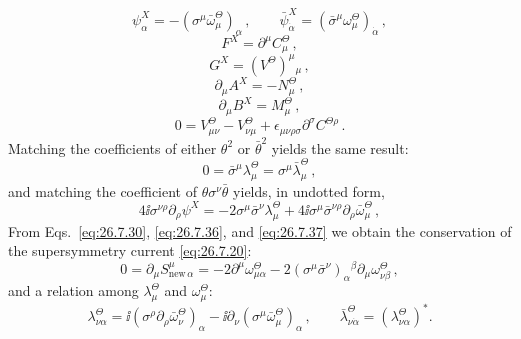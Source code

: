 \begin{equation}
  \psi_\alpha^X
  =-(\sigma^\mu\bar\omega_\mu^\Theta)_\alpha\,,
  \qquad
  \bar\psi_{\dot\alpha}^X
  =(\bar\sigma^\mu\omega_\mu^\Theta)_{\dot\alpha}\,,
  \tag{26.7.30}\label{eq:26.7.30}
\end{equation}
\begin{equation}
  F^X=\partial^\mu C_\mu^\Theta\,,
  \tag{26.7.31}\label{eq:26.7.31}
\end{equation}
\begin{equation}
  G^X=(V^\Theta)^\mu{}_\mu\,,
  \tag{26.7.32}\label{eq:26.7.32}
\end{equation}
\begin{equation}
  \partial_\mu A^X=-N_\mu^\Theta\,,
  \tag{26.7.33}\label{eq:26.7.33}
\end{equation}
\begin{equation}
  \partial_\mu B^X=M_\mu^\Theta\,,
  \tag{26.7.34}\label{eq:26.7.34}
\end{equation}
\begin{equation}
  0=V_{\mu\nu}^\Theta-V_{\nu\mu}^\Theta
    +\epsilon_{\mu\nu\rho\sigma}\partial^\sigma C^{\Theta\rho}\,.
  \tag{26.7.35}\label{eq:26.7.35}
\end{equation}
Matching the coefficients of either \(\theta^2\) or \(\bar\theta^2\)
yields the same result:
\begin{equation}
  0=\bar\sigma^\mu\lambda_\mu^\Theta
  =\sigma^\mu\bar\lambda_\mu^\Theta\,,
  \tag{26.7.36}\label{eq:26.7.36}
\end{equation}
and matching the coefficient of \(\theta\sigma^\nu\bar\theta\) yields,
in undotted form,
\begin{equation}
  4\ii\sigma^{\nu\rho}\partial_\rho\psi^X
  =-2\sigma^\mu\bar\sigma^\nu\lambda_\mu^\Theta
   +4\ii\sigma^\mu\bar\sigma^{\nu\rho}
      \partial_\rho\bar\omega_\mu^\Theta\,,
  \tag{26.7.37}\label{eq:26.7.37}
\end{equation}
From Eqs.~\eqref{eq:26.7.30}, \eqref{eq:26.7.36}, and
\eqref{eq:26.7.37} we obtain the conservation of the supersymmetry current
\eqref{eq:26.7.20}:
\begin{equation}
  0=\partial_\mu S_{\mathrm{new}\,\alpha}^\mu
  =-2\partial^\mu\omega_{\mu\alpha}^\Theta
   -2(\sigma^\mu\bar\sigma^\nu)_\alpha{}^\beta
      \partial_\mu\omega_{\nu\beta}^\Theta\,,
  \tag{26.7.38}\label{eq:26.7.38}
\end{equation}
and a relation among \(\lambda_\mu^\Theta\) and \(\omega_\mu^\Theta\):
\begin{equation}
  \lambda_{\nu\alpha}^\Theta
  =\ii(\sigma^\rho\partial_\rho\bar\omega_\nu^\Theta)_\alpha
   -\ii\partial_\nu
      (\sigma^\mu\bar\omega_\mu^\Theta)_\alpha\,,
  \qquad
  \bar\lambda_{\nu\dot\alpha}^\Theta
  =(\lambda_{\nu\alpha}^\Theta)^* .
  \tag{26.7.39}\label{eq:26.7.39}
\end{equation}
